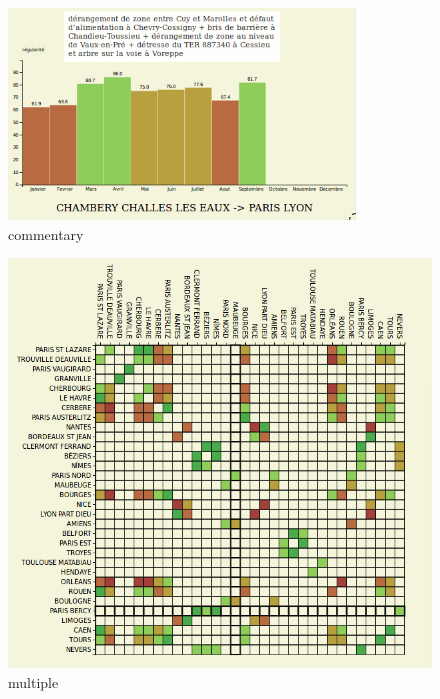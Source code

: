 \documentclass{vgtc}
\begin{document}
\begin{figure}[h!]
 \includegraphics[width=\columnwidth]{comm}
 \caption{commentary}
 \label{fig:comm}
\end{figure}
\begin{figure}[h!]
 \includegraphics[width=\columnwidth]{intermul}
 \caption{multiple}
 \label{fig:intermul}
\end{figure}
\end{document}

